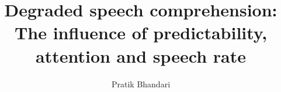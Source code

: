 \documentclass[a4paper, nobind]{templates/ociamthesis}
\title{Degraded speech comprehension:\\
The influence of predictability, attention and speech rate}
\author{Pratik Bhandari}
\begin{document}
\setlength{\textbaselineskip}{22pt plus2pt}

\setlength{\frontmatterbaselineskip}{17pt plus1pt minus1pt}

\setlength{\abstractseparatelineskip}{13pt plus1pt minus1pt}
\setlength{\abstractseparateparskip}{0pt plus 1pt}

\setlength{\parskip}{2pt plus 1pt}

%
%
\def\crest{{\texttt{[image: templates/beltcrest.png]}}}
\renewcommand{\university}{Saarland University}
\renewcommand{\submittedtext}{A thesis submitted for the degree of}
\renewcommand{\thesistitlesize}{\fontsize{22pt}{28pt}\selectfont}
\renewcommand{\gapbeforecrest}{25mm}
\renewcommand{\gapaftercrest}{25mm}


\setlength{\baselineskip}{\textbaselineskip}



\setcounter{secnumdepth}{2}
\setcounter{tocdepth}{2}


\end{document}
